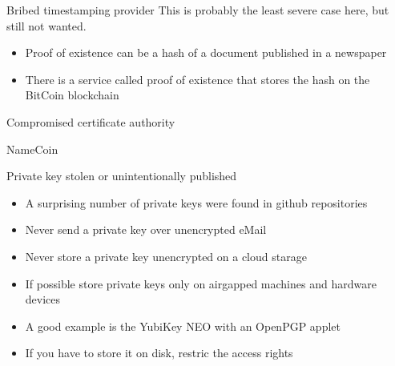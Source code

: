 \documentclass[11pt]{beamer}
\begin{document}
\begin{frame}{Bribed timestamping provider}
This is probably the least severe case here, but still not wanted.
\\[0.2cm]
\begin{itemize}
\item Proof of existence can be a hash of a document published in a newspaper
\item There is a service called proof of existence that stores the hash on the BitCoin blockchain
\end{itemize}
\end{frame}

\begin{frame}{Compromised certificate authority}
\end{frame}

\begin{frame}{NameCoin}
\end{frame}

\begin{frame}{Private key stolen or unintentionally published}
\begin{itemize}
\item A surprising number of private keys were found in github repositories
\item Never send a private key over unencrypted eMail %
\item Never store a private key unencrypted on a cloud starage
\item If possible store private keys only on airgapped machines and hardware devices
\item A good example is the YubiKey NEO with an OpenPGP applet
\item If you have to store it on disk, restric the access rights
\end{itemize}
\end{frame}
\end{document}
